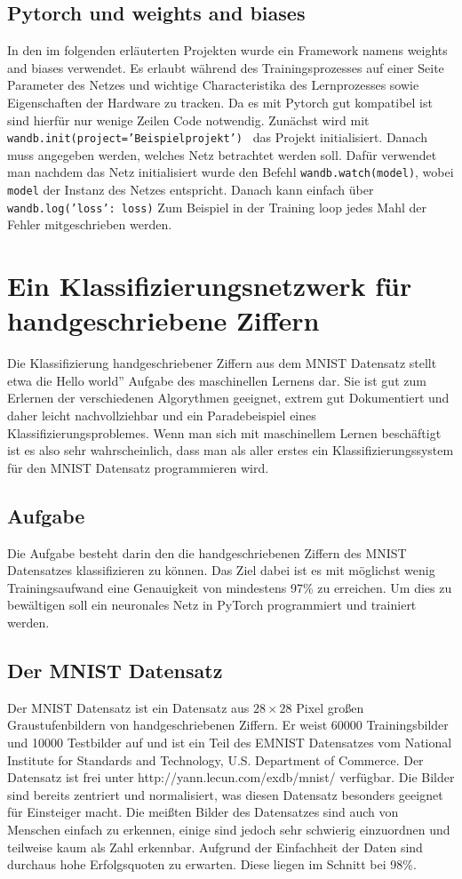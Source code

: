 \documentclass{article}
\begin{document}
\subsection{Pytorch und weights and biases}
In den im folgenden erläuterten Projekten wurde ein Framework namens weights and biases verwendet. Es erlaubt während des Trainingsprozesses auf einer Seite Parameter des Netzes und wichtige Characteristika des Lernprozesses sowie Eigenschaften der Hardware zu tracken. Da es mit Pytorch gut kompatibel ist sind hierfür nur wenige Zeilen Code notwendig. Zunächst wird mit\\ \texttt{wandb.init(project='Beispielprojekt')
} das Projekt initialisiert. Danach muss angegeben werden, welches Netz betrachtet werden soll. Dafür verwendet man nachdem das Netz initialisiert wurde den Befehl \texttt{wandb.watch(model)}, wobei \texttt{model} der Instanz des Netzes entspricht. Danach kann einfach über\\ 
\texttt{wandb.log({'loss': loss})} Zum Beispiel in der Training loop jedes Mahl der Fehler mitgeschrieben werden.
\section{Ein Klassifizierungsnetzwerk für handgeschriebene Ziffern}
Die Klassifizierung handgeschriebener Ziffern aus dem MNIST Datensatz stellt etwa die \glqq Hello world'' Aufgabe des maschinellen Lernens dar. Sie ist gut zum Erlernen der verschiedenen Algorythmen geeignet, extrem gut Dokumentiert und daher leicht nachvollziehbar und ein Paradebeispiel eines Klassifizierungsproblemes. Wenn man sich mit maschinellem Lernen beschäftigt ist es also sehr wahrscheinlich, dass man als aller erstes ein Klassifizierungssystem für den MNIST Datensatz programmieren wird.
\subsection{Aufgabe}
Die Aufgabe besteht darin den die handgeschriebenen Ziffern des MNIST Datensatzes klassifizieren zu können. Das Ziel dabei ist es mit möglichst wenig Trainingsaufwand eine Genauigkeit von mindestens 97\% zu erreichen. Um dies zu bewältigen soll ein neuronales Netz in PyTorch programmiert und trainiert werden.
\subsection{Der MNIST Datensatz}
Der MNIST Datensatz ist ein Datensatz aus $28\times28$ Pixel großen Graustufenbildern von handgeschriebenen Ziffern. Er weist 60000 Trainingsbilder und 10000 Testbilder auf und ist ein Teil des EMNIST Datensatzes vom National Institute for Standards and Technology, U.S. Department of Commerce. Der Datensatz ist frei unter http://yann.lecun.com/exdb/mnist/ verfügbar. Die Bilder sind bereits zentriert und normalisiert, was diesen Datensatz besonders geeignet für Einsteiger macht. Die meißten Bilder des Datensatzes sind auch von Menschen einfach zu erkennen, einige sind jedoch sehr schwierig einzuordnen und teilweise kaum als Zahl erkennbar. Aufgrund der Einfachheit der Daten sind durchaus hohe Erfolgsquoten zu erwarten. Diese liegen im Schnitt bei 98\%.
\end{document}
